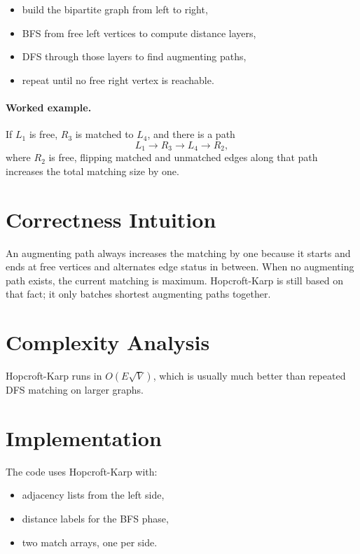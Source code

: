 \begin{itemize}
  \item build the bipartite graph from left to right,
  \item BFS from free left vertices to compute distance layers,
  \item DFS through those layers to find augmenting paths,
  \item repeat until no free right vertex is reachable.
\end{itemize}

\paragraph{Worked example.}
If \(L_1\) is free, \(R_3\) is matched to \(L_4\), and there is a path
\[
L_1 \to R_3 \to L_4 \to R_2,
\]
where \(R_2\) is free, flipping matched and unmatched edges along that path increases the total matching size by one.

\section*{Correctness Intuition}

An augmenting path always increases the matching by one because it starts and ends at free vertices and alternates
edge status in between. When no augmenting path exists, the current matching is maximum. Hopcroft-Karp is still based
on that fact; it only batches shortest augmenting paths together.

\section*{Complexity Analysis}

Hopcroft-Karp runs in \(O(E \sqrt{V})\), which is usually much better than repeated DFS matching on larger graphs.

\section*{Implementation}

The code uses Hopcroft-Karp with:

\begin{itemize}
  \item adjacency lists from the left side,
  \item distance labels for the BFS phase,
  \item two match arrays, one per side.
\end{itemize}

